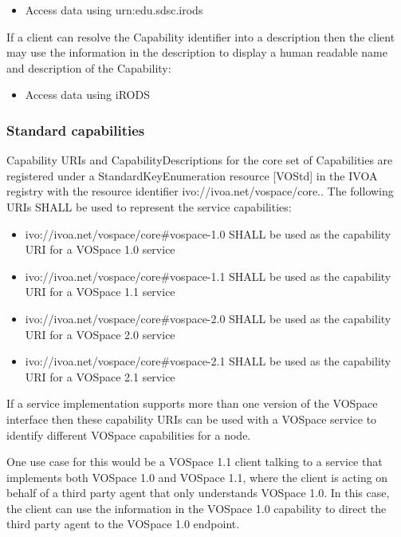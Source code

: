 \documentclass[11pt,a4paper]{ivoa}
\begin{document}
\begin{itemize}
    \item Access data using urn:edu.sdsc.irods
\end{itemize}

If a client can resolve the Capability identifier into a description then the client may use the information in the description to display a human readable name and description of the Capability:

\begin{itemize}
    \item Access data using iRODS
\end{itemize}

\subsubsection{Standard capabilities}
\label{subsubsec:standard capabilities}
Capability URIs and CapabilityDescriptions for the core set of Capabilities are registered under a StandardKeyEnumeration resource [VOStd] in the IVOA registry with the resource identifier ivo://ivoa.net/vospace/core.. The following URIs SHALL be used to represent the service capabilities:

\begin{itemize}
    \item ivo://ivoa.net/vospace/core\#vospace-1.0 SHALL be used as the capability URI for a VOSpace 1.0 service
    \item ivo://ivoa.net/vospace/core\#vospace-1.1 SHALL be used as the capability URI for a VOSpace 1.1 service
    \item ivo://ivoa.net/vospace/core\#vospace-2.0 SHALL be used as the capability URI for a VOSpace 2.0 service
    \item ivo://ivoa.net/vospace/core\#vospace-2.1 SHALL be used as the capability URI for a VOSpace 2.1 service
\end{itemize}
If a service implementation supports more than one version of the VOSpace interface then these capability URIs can be used with a VOSpace service to identify different VOSpace capabilities for a node.

One use case for this would be a VOSpace 1.1 client talking to a service that implements both VOSpace 1.0 and VOSpace 1.1, where the client is acting on behalf of a third party agent that only understands VOSpace 1.0. In this case, the client can use the information in the VOSpace 1.0 capability to direct the third party agent to the VOSpace 1.0 endpoint.
\end{document}

